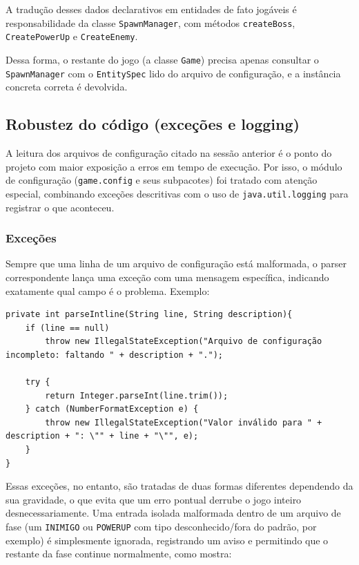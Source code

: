 A tradução desses dados declarativos em entidades de fato jogáveis é
responsabilidade da classe \texttt{SpawnManager}, com métodos \texttt{createBoss},
\texttt{CreatePowerUp} e \texttt{CreateEnemy}.

Dessa forma, o restante do jogo (a classe \texttt{Game}) precisa apenas consultar o
\texttt{SpawnManager} com o \texttt{EntitySpec} lido do arquivo de
configuração, e a instância concreta correta é devolvida.

\subsection{Robustez do código (exceções e logging)}

A leitura dos arquivos de configuração citado na sessão anterior é o ponto do projeto com maior
exposição a erros em tempo de execução. Por isso, o módulo de
configuração (\texttt{game.config} e seus subpacotes) foi tratado com atenção
especial, combinando exceções descritivas com o uso de
\texttt{java.util.logging} para registrar o que aconteceu.

\subsubsection{Exceções}

Sempre que uma linha de um arquivo de configuração está malformada, o parser
correspondente lança uma exceção com uma mensagem específica, indicando
exatamente qual campo é o problema. Exemplo:

\begin{lstlisting}[caption={Exceções descritivas (GameConfigParser.java)}]
private int parseIntline(String line, String description){
    if (line == null)
        throw new IllegalStateException("Arquivo de configuração incompleto: faltando " + description + ".");

    try {
        return Integer.parseInt(line.trim());
    } catch (NumberFormatException e) {
        throw new IllegalStateException("Valor inválido para " + description + ": \"" + line + "\"", e);
    }
}
\end{lstlisting}

Essas exceções, no entanto, são tratadas de duas formas diferentes dependendo
da sua gravidade, o que evita que um erro pontual derrube o jogo inteiro
desnecessariamente. Uma entrada isolada malformada dentro de um arquivo de
fase (um \texttt{INIMIGO} ou \texttt{POWERUP} com tipo
desconhecido/fora do padrão, por exemplo) é simplesmente ignorada, registrando um aviso e
permitindo que o restante da fase continue normalmente, como mostra:

